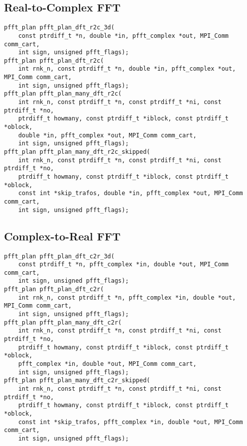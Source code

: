 \subsection{Real-to-Complex FFT}
\begin{lstlisting}
pfft_plan pfft_plan_dft_r2c_3d(
    const ptrdiff_t *n, double *in, pfft_complex *out, MPI_Comm comm_cart,
    int sign, unsigned pfft_flags);
pfft_plan pfft_plan_dft_r2c(
    int rnk_n, const ptrdiff_t *n, double *in, pfft_complex *out, MPI_Comm comm_cart,
    int sign, unsigned pfft_flags);
pfft_plan pfft_plan_many_dft_r2c(
    int rnk_n, const ptrdiff_t *n, const ptrdiff_t *ni, const ptrdiff_t *no,
    ptrdiff_t howmany, const ptrdiff_t *iblock, const ptrdiff_t *oblock,
    double *in, pfft_complex *out, MPI_Comm comm_cart,
    int sign, unsigned pfft_flags);
pfft_plan pfft_plan_many_dft_r2c_skipped(
    int rnk_n, const ptrdiff_t *n, const ptrdiff_t *ni, const ptrdiff_t *no,
    ptrdiff_t howmany, const ptrdiff_t *iblock, const ptrdiff_t *oblock,
    const int *skip_trafos, double *in, pfft_complex *out, MPI_Comm comm_cart,
    int sign, unsigned pfft_flags);
\end{lstlisting}

\subsection{Complex-to-Real FFT}
\begin{lstlisting}
pfft_plan pfft_plan_dft_c2r_3d(
    const ptrdiff_t *n, pfft_complex *in, double *out, MPI_Comm comm_cart,
    int sign, unsigned pfft_flags);
pfft_plan pfft_plan_dft_c2r(
    int rnk_n, const ptrdiff_t *n, pfft_complex *in, double *out, MPI_Comm comm_cart,
    int sign, unsigned pfft_flags);
pfft_plan pfft_plan_many_dft_c2r(
    int rnk_n, const ptrdiff_t *n, const ptrdiff_t *ni, const ptrdiff_t *no,
    ptrdiff_t howmany, const ptrdiff_t *iblock, const ptrdiff_t *oblock,
    pfft_complex *in, double *out, MPI_Comm comm_cart,
    int sign, unsigned pfft_flags);
pfft_plan pfft_plan_many_dft_c2r_skipped(
    int rnk_n, const ptrdiff_t *n, const ptrdiff_t *ni, const ptrdiff_t *no,
    ptrdiff_t howmany, const ptrdiff_t *iblock, const ptrdiff_t *oblock,
    const int *skip_trafos, pfft_complex *in, double *out, MPI_Comm comm_cart,
    int sign, unsigned pfft_flags);
\end{lstlisting}

